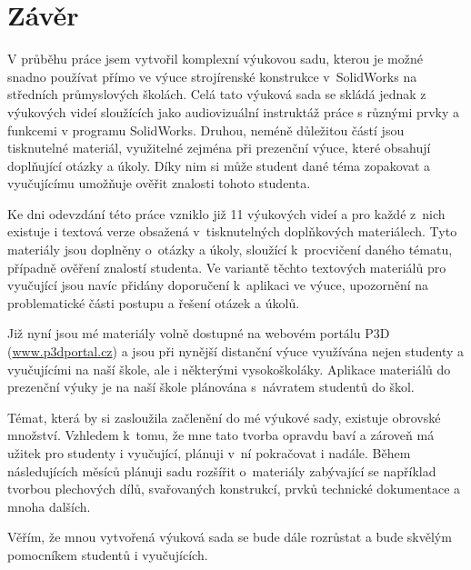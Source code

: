 \chapter*{Závěr}
V průběhu práce jsem vytvořil komplexní výukovou sadu, kterou je možné snadno používat přímo ve výuce strojírenské konstrukce v~SolidWorks na středních průmyslových školách.
Celá tato výuková sada se skládá jednak z výukových videí sloužících jako audiovizuální instruktáž práce s různými prvky a funkcemi v programu SolidWorks.
Druhou, neméně důležitou částí jsou tisknutelné materiál, využitelné zejména při prezenční výuce, které obsahují doplňující otázky a úkoly.
Díky nim si může student dané téma zopakovat a vyučujícímu umožňuje ověřit znalosti tohoto studenta. 

Ke dni odevzdání této práce vzniklo již 11 výukových videí a pro každé z~nich existuje i textová verze obsažená v~tisknutelných doplňkových materiálech.
Tyto materiály jsou doplněny o~otázky a úkoly, sloužící k~procvičení daného tématu, případně ověření znalostí studenta.
Ve variantě těchto textových materiálů pro vyučující jsou navíc přidány doporučení k~aplikaci ve výuce, upozornění na problematické části postupu a řešení otázek a úkolů.

Již nyní jsou mé materiály volně dostupné na webovém portálu P3D (\href{https://www.p3dportal.cz}{www.p3dportal.cz}) a jsou při nynější distanční výuce využívána nejen studenty a vyučujícími na naší škole, ale i některými vysokoškoláky.
Aplikace materiálů do prezenční výuky je na naší škole plánována s~návratem studentů do škol.

Témat, která by si zasloužila začlenění do mé výukové sady, existuje obrovské množství.
Vzhledem k~tomu, že mne tato tvorba opravdu baví a zároveň má užitek pro studenty i vyučující, plánuji v~ní pokračovat i nadále.
Během následujících měsíců plánuji sadu rozšířit o~materiály zabývající se například tvorbou plechových dílů, svařovaných konstrukcí, prvků technické dokumentace a mnoha dalších.

Věřím, že mnou vytvořená výuková sada se bude dále rozrůstat a bude skvělým pomocníkem studentů i vyučujících.
\newpage